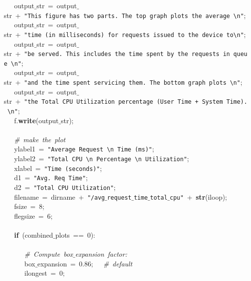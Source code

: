 \mbox{}\ \ \ output$\_$str\ =\ output$\_$str\ +\ \texttt{"{}This\ figure\ has\ two\ parts.\ The\ top\ graph\ plots\ the\ average\ \textbackslash{}n"{}}; \\
\mbox{}\ \ \ output$\_$str\ =\ output$\_$str\ +\ \texttt{"{}time\ (in\ milliseconds)\ for\ requests\ issued\ to\ the\ device\ to\textbackslash{}n"{}}; \\
\mbox{}\ \ \ output$\_$str\ =\ output$\_$str\ +\ \texttt{"{}be\ served.\ This\ includes\ the\ time\ spent\ by\ the\ requests\ in\ queue\ \textbackslash{}n"{}}; \\
\mbox{}\ \ \ output$\_$str\ =\ output$\_$str\ +\ \texttt{"{}and\ the\ time\ spent\ servicing\ them.\ The\ bottom\ graph\ plots\ \textbackslash{}n"{}}; \\
\mbox{}\ \ \ output$\_$str\ =\ output$\_$str\ +\ \texttt{"{}the\ Total\ CPU\ Utilization\ percentage\ (User\ Time\ +\ System\ Time).\ \textbackslash{}n"{}}; \\
\mbox{}\ \ \ f.\textbf{write}(output$\_$str); \\
\mbox{}\ \ \  \\
\mbox{}\ \ \ \textit{\#\ make\ the\ plot} \\
\mbox{}\ \ \ ylabel1\ =\ \texttt{"{}Average\ Request\ \textbackslash{}n\ Time\ (ms)"{}}; \\
\mbox{}\ \ \ ylabel2\ =\ \texttt{"{}Total\ CPU\ \textbackslash{}n\ Percentage\ \textbackslash{}n\ Utilization"{}}; \\
\mbox{}\ \ \ xlabel\ =\ \texttt{"{}Time\ (seconds)"{}}; \\
\mbox{}\ \ \ d1\ =\ \texttt{"{}Avg.\ Req\ Time"{}}; \\
\mbox{}\ \ \ d2\ =\ \texttt{"{}Total\ CPU\ Utilization"{}}; \\
\mbox{}\ \ \ filename\ =\ dirname\ +\ \texttt{"{}/avg$\_$request$\_$time$\_$total$\_$cpu"{}}\ +\ \textbf{str}(iloop); \\
\mbox{}\ \ \ fsize\ =\ 8; \\
\mbox{}\ \ \ flegsize\ =\ 6; \\
\mbox{}\ \ \  \\
\mbox{}\ \ \ \textbf{if}\ (combined$\_$plots\ ==\ 0): \\
\mbox{}\ \ \ \ \ \  \\
\mbox{}\ \ \ \ \ \ \textit{\#\ Compute\ box$\_$expansion\ factor:} \\
\mbox{}\ \ \ \ \ \ box$\_$expansion\ =\ 0.86;\ \ \ \textit{\#\ default} \\
\mbox{}\ \ \ \ \ \ ilongest\ =\ 0; \\
